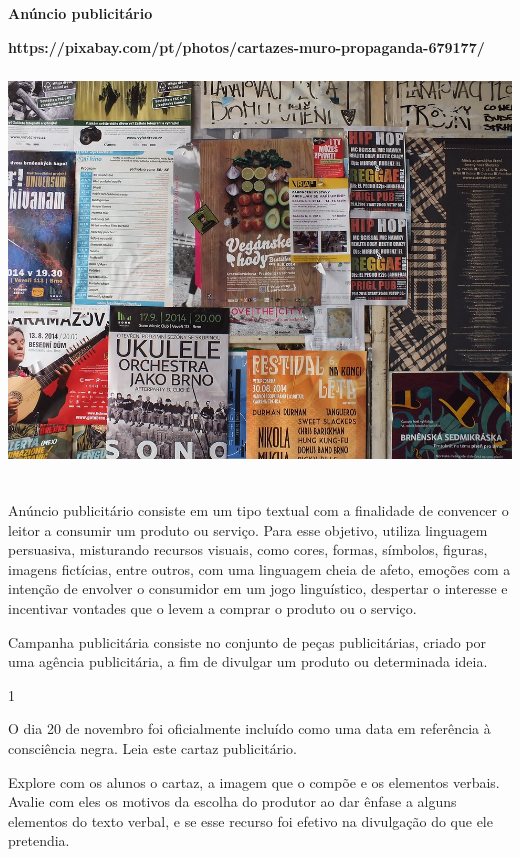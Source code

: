 \begin{itemize}
{{{\begin{itemize}
\begin{itemize}
\textbf{Anúncio publicitário}

\textbf{https://pixabay.com/pt/photos/cartazes-muro-propaganda-679177/}\includegraphics[width=5.90556in,height=4.42917in]{media/image13.jpeg}

Anúncio publicitário consiste em um tipo textual com a finalidade de
convencer o leitor a consumir um produto ou serviço. Para esse objetivo,
utiliza linguagem persuasiva, misturando recursos visuais, como cores,
formas, símbolos, figuras, imagens fictícias, entre outros, com uma
linguagem cheia de afeto, emoções com a intenção de envolver o
consumidor em um jogo linguístico, despertar o interesse e incentivar
vontades que o levem a comprar o produto ou o serviço.

Campanha publicitária consiste no conjunto de peças publicitárias,
criado por uma agência publicitária, a fim de divulgar um produto ou
determinada ideia.


\num{1}

O dia 20 de novembro foi oficialmente incluído como uma data em
referência à consciência negra. Leia este cartaz publicitário.

Explore com os alunos o cartaz, a imagem que o compõe e os elementos
verbais. Avalie com eles os motivos da escolha do produtor ao dar ênfase
a alguns elementos do texto verbal, e se esse recurso foi efetivo na
divulgação do que ele pretendia.


\end{itemize}
\end{itemize}}}}
\end{itemize}
